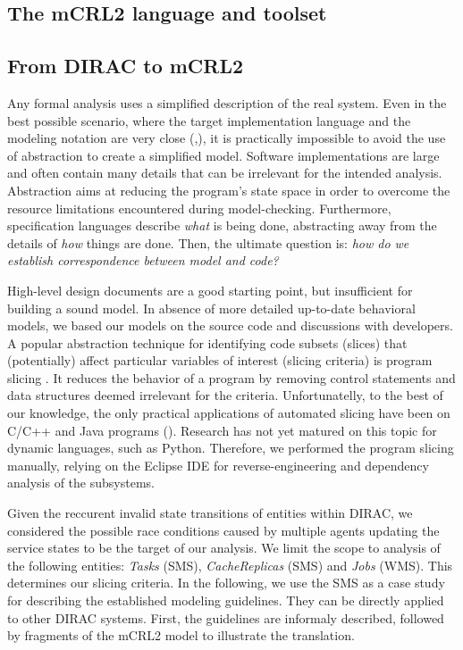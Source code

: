 \documentclass[10pt,conference]{IEEEtran}
\begin{document}
\subsection{The mCRL2 language and toolset}
\lipsum[2-6]
\subsection{From DIRAC to mCRL2}

Any formal analysis uses a simplified description of the real system. Even in the 
best possible scenario, where the target implementation language and the modeling 
notation are very close (\cite{Java_PathFinder},\cite{Musuvathi04modelchecking}), 
it is practically impossible to avoid the use of abstraction to create a simplified model. 
Software implementations are large and often contain many details that can be irrelevant 
for the intended analysis. Abstraction aims at reducing
the program's state space in order to overcome the resource limitations \cite{Pelánek08fightingstate} encountered during model-checking.
Furthermore, specification languages describe \textit{what} is being done, 
abstracting away from the details of \textit{how} things are done. 
Then, the ultimate question is: \textit{how do we establish correspondence between model and code?}

High-level design documents are a good starting point, but insufficient for 
building a sound model.
In absence of more detailed up-to-date behavioral models, 
we based our models on the source code and discussions with developers.
A popular abstraction technique
for identifying code subsets (slices) that (potentially) affect particular 
variables of interest (slicing criteria) is program slicing \cite{Hatcliff99slicingsoftware}. 
It reduces the behavior of a program
by removing control statements and data structures deemed irrelevant for 
the criteria. Unfortunatelly, to the best of our knowledge, the only practical
applications of automated slicing have been
on C/C++ and Java programs (\cite{frama_c,codeSurfer,Corbett00bandera}). Research has not yet
matured on this topic for dynamic languages, such as Python. 
Therefore, we performed the program slicing manually, relying on the Eclipse IDE for 
reverse-engineering and dependency analysis of the subsystems.

Given the reccurent invalid state transitions of entities within DIRAC, 
we considered the possible race conditions caused by multiple agents updating 
the service states to be the target of our analysis. We limit the scope
to analysis of the following entities: \textit{Tasks} (SMS), \textit{CacheReplicas} (SMS) and \textit{Jobs} (WMS).
This determines our slicing criteria. In the following, we use the SMS as a case study
for describing the established modeling guidelines. They can be 
directly applied to other DIRAC systems. First, the 
guidelines are informaly described, followed by fragments 
of the mCRL2 model to illustrate the translation.
\end{document}
